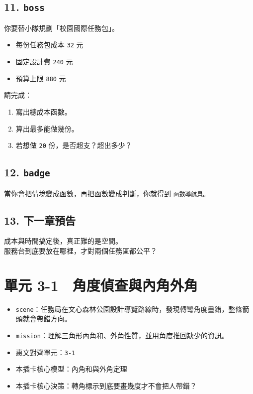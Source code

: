 \documentclass[
  chinese,
  12pt,
  a4paper,
  oneside]{article}
\providecommand{\tightlist}{%
  \setlength{\itemsep}{0pt}\setlength{\parskip}{0pt}}
\begin{document}
\subsection{\texorpdfstring{11. \texttt{boss}}{11. boss}}\label{boss-1}

你要替小隊規劃「校園國際任務包」。

\begin{itemize}
\tightlist
\item
  每份任務包成本 \texttt{32} 元
\item
  固定設計費 \texttt{240} 元
\item
  預算上限 \texttt{880} 元
\end{itemize}

請完成：

\begin{enumerate}
\def\labelenumi{\arabic{enumi}.}
\tightlist
\item
  寫出總成本函數。
\item
  算出最多能做幾份。
\item
  若想做 \texttt{20} 份，是否超支？超出多少？
\end{enumerate}

\subsection{\texorpdfstring{12.
\texttt{badge}}{12. badge}}\label{badge-1}

當你會把情境變成函數，再把函數變成判斷，你就得到 \texttt{函數導航員}。

\subsection{13. 下一章預告}\label{ux4e0bux4e00ux7ae0ux9810ux544a-1}

成本與時間搞定後，真正難的是空間。\\
服務台到底要放在哪裡，才對兩個任務區都公平？

\newpage

\section{單元
3-1　角度偵查與內角外角}\label{ux55aeux5143-3-1-ux89d2ux5ea6ux5075ux67e5ux8207ux5167ux89d2ux5916ux89d2}

\begin{itemize}
\tightlist
\item
  \texttt{scene}：任務局在文心森林公園設計導覽路線時，發現轉彎角度畫錯，整條箭頭就會帶錯方向。
\item
  \texttt{mission}：理解三角形內角和、外角性質，並用角度推回缺少的資訊。
\item
  惠文對齊單元：\texttt{3-1}
\item
  本插卡核心模型：內角和與外角定理
\item
  本插卡核心決策：轉角標示到底要畫幾度才不會把人帶錯？
\end{itemize}
\end{document}

